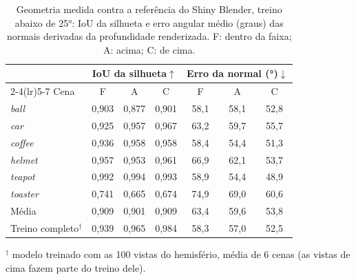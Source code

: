 \begin{table}[t]
\centering
\caption{Geometria medida contra a referência do Shiny Blender, treino abaixo de 25°: IoU da silhueta e erro angular médio (graus) das normais derivadas da profundidade renderizada. F: dentro da faixa; A: acima; C: de cima.}
\label{tab:geometria25}
\setlength{\tabcolsep}{4pt}
\footnotesize
\begin{tabular}{l ccc ccc}
\toprule
 & \multicolumn{3}{c}{IoU da silhueta$\uparrow$} & \multicolumn{3}{c}{Erro da normal (°)$\downarrow$} \\
\cmidrule(lr){2-4}\cmidrule(lr){5-7}
Cena & F & A & C & F & A & C \\
\midrule
\textit{ball} & 0{,}903 & 0{,}877 & 0{,}901 & 58{,}1 & 58{,}1 & 52{,}8 \\
\textit{car} & 0{,}925 & 0{,}957 & 0{,}967 & 63{,}2 & 59{,}7 & 55{,}7 \\
\textit{coffee} & 0{,}936 & 0{,}958 & 0{,}958 & 58{,}4 & 54{,}4 & 51{,}3 \\
\textit{helmet} & 0{,}957 & 0{,}953 & 0{,}961 & 66{,}9 & 62{,}1 & 53{,}7 \\
\textit{teapot} & 0{,}992 & 0{,}994 & 0{,}993 & 58{,}9 & 54{,}4 & 48{,}9 \\
\textit{toaster} & 0{,}741 & 0{,}665 & 0{,}674 & 74{,}9 & 69{,}0 & 60{,}6 \\
\midrule
Média & 0{,}909 & 0{,}901 & 0{,}909 & 63{,}4 & 59{,}6 & 53{,}8 \\
Treino completo$^\dagger$ & 0{,}939 & 0{,}965 & 0{,}984 & 58{,}3 & 57{,}0 & 52{,}5 \\
\bottomrule
\end{tabular}
\vspace{2pt}
{\scriptsize $^\dagger$ modelo treinado com as 100 vistas do hemisfério, média de 6 cenas (as vistas de cima fazem parte do treino dele).}
\end{table}
